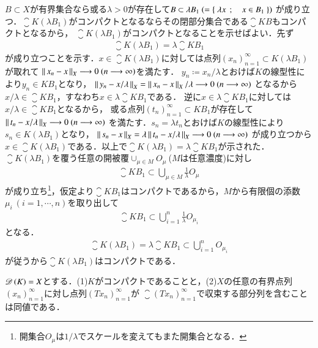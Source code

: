 	\begin{prf}
		$B \subset X$が有界集合なら或る$\lambda > 0$が存在して$B \subset \lambda B_1\ (= \left\{\ \lambda x\ \, ; \quad x \in B_1\ \right\})$
		が成り立つ．$\closure{K(\lambda B_1)}$がコンパクトとなるならその閉部分集合である$\closure{KB}$もコンパクトとなるから，
		$\closure{K(\lambda B_1)}$がコンパクトとなることを示せばよい．先ず
		\begin{align}
			\closure{K(\lambda B_1)} = \lambda \closure{KB_1}
		\end{align}
		が成り立つことを示す．$x \in \closure{K(\lambda B_1)}$に対しては点列$(x_n)_{n=1}^{\infty} \subset K(\lambda B_1)$が取れて
		$\left\|\, x_n - x\, \right\|_{X} \longrightarrow 0\ (n \longrightarrow \infty)$を満たす．
		$y_n \coloneqq x_n/\lambda$とおけば$K$の線型性により$y_n \in KB_1$となり，
		$\left\|\, y_n - x/\lambda\, \right\|_{X}= \left\|\, x_n - x\, \right\|_{X}/\lambda \longrightarrow 0\ (n \longrightarrow \infty)$
		となるから$x/\lambda \in \closure{KB_1}$，すなわち$x \in \lambda\closure{KB_1}$である．
		逆に$x \in \lambda \closure{KB_1}$に対しては$x/\lambda \in \closure{KB_1}$となるから，
		或る点列$(t_n)_{n=1}^{\infty} \subset KB_1$が存在して$\left\|\, t_n - x/\lambda\, \right\|_{X} \longrightarrow 0\ (n \longrightarrow \infty)$
		を満たす．$s_n = \lambda t_n$とおけば$K$の線型性により$s_n \in K(\lambda B_1)$となり，
		$\left\|\, s_n - x\, \right\|_{X}= \lambda \left\|\, t_n - x/\lambda\, \right\|_{X} \longrightarrow 0\ (n \longrightarrow \infty)$
		が成り立つから$x \in \closure{K(\lambda B_1)}$である．以上で$\closure{K(\lambda B_1)} = \lambda \closure{KB_1}$が示された．
		$\closure{K(\lambda B_1)}$を覆う任意の開被覆$\cup_{\mu \in M}O_\mu\ $($M$は任意濃度)に対し
		\begin{align}
			\closure{KB_1} \subset \bigcup_{\mu \in M} \tfrac{1}{\lambda}O_\mu
		\end{align}
		が成り立ち\footnote{開集合$O_\mu$は$1/\lambda$でスケールを変えてもまた開集合となる．}，仮定より$\closure{KB_1}$はコンパクトであるから，$M$から有限個の添数$\mu_i\ (i=1,\cdots,n)$を取り出して
		\begin{align}
			\closure{KB_1} \subset \bigcup_{i=1}^{n} \tfrac{1}{\lambda}O_{\mu_i}
		\end{align}
		となる．
		\begin{align}
			\closure{K(\lambda B_1)} = \lambda \closure{KB_1} \subset \bigcup_{i=1}^{n} O_{\mu_i}
		\end{align}
		が従うから$\closure{K(\lambda B_1)}$はコンパクトである．
		\QED
	\end{prf}
	
	\begin{screen}
		\begin{lem}[コンパクト作用素であることの同値条件]
			$\Dom{K} = X$とする．(1)$K$がコンパクトであることと，(2)$X$の任意の有界点列$(x_n)_{n=1}^{\infty}$に対し点列$(Tx_n)_{n=1}^{\infty}$が
			$\closure{(Tx_n)_{n=1}^{\infty}}$で収束する部分列を含むことは同値である．
			\label{lem:compact_operator_equiv_cond}
		\end{lem}
	\end{screen}
	
